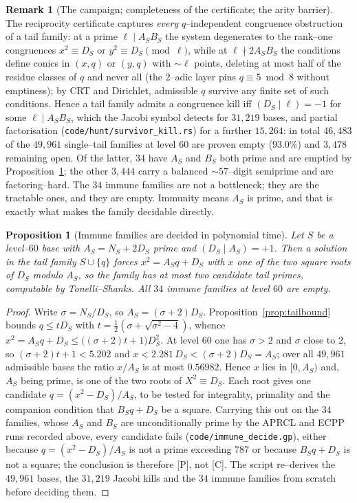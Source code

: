 \documentclass[11pt]{article}
\newtheorem{proposition}[theorem]{Proposition}
\theoremstyle{definition}
\newtheorem{remark}[theorem]{Remark}
\begin{document}
\begin{remark}[The campaign; completeness of the certificate; the arity barrier]\label{rem:campaign}
The reciprocity certificate captures \emph{every} $q$--independent congruence obstruction of a
tail family: at a prime $\ell\mid A_SB_S$ the system degenerates to the rank--one congruences
$x^2\equiv D_S$ or $y^2\equiv D_S\pmod\ell$, while at $\ell\nmid 2A_SB_S$ the conditions define
conics in $(x,q)$ or $(y,q)$ with $\sim\ell$ points, deleting at most half of the residue classes
of $q$ and never all (the $2$--adic layer pins $q\equiv5\bmod8$ without emptiness); by CRT and
Dirichlet, admissible $q$ survive any finite set of such conditions. Hence a tail family admits a
congruence kill iff $(D_S\mid\ell)=-1$ for some $\ell\mid A_SB_S$, which the Jacobi symbol
detects for $31{,}219$ bases, and partial factorisation (\texttt{code/hunt/survivor\_kill.rs}) for a
further $15{,}264$: in total $46{,}483$ of the $49{,}961$ single--tail families at level $60$ are
proven empty ($93.0\%$) and $3{,}478$ remaining open. Of the latter, $34$ have $A_S$ and $B_S$ both
prime and are emptied by Proposition~\ref{prop:immunedecide}; the other $3{,}444$ carry a balanced
${\sim}57$--digit semiprime and are factoring--hard.
The $34$ immune families are not a bottleneck; they are the tractable ones, and they are empty.
Immunity means $A_S$ is prime, and that is exactly what makes the family decidable directly.

\begin{proposition}[Immune families are decided in polynomial time]\label{prop:immunedecide}
Let $S$ be a level--$60$ base with $A_S=N_S+2D_S$ prime and $(D_S\mid A_S)=+1$. Then a solution in the
tail family $S\cup\{q\}$ forces $x^2=A_Sq+D_S$ with $x$ one of the two square roots of $D_S$ modulo
$A_S$, so the family has at most two candidate tail primes, computable by Tonelli--Shanks. All $34$
immune families at level $60$ are empty.
\end{proposition}
\begin{proof}
Write $\sigma=N_S/D_S$, so $A_S=(\sigma+2)D_S$. Proposition~\ref{prop:tailbound} bounds
$q\le tD_S$ with $t=\tfrac12(\sigma+\sqrt{\sigma^2-4})$, whence
$x^2=A_Sq+D_S\le\bigl((\sigma+2)t+1\bigr)D_S^2$. At level $60$ one has $\sigma>2$ and $\sigma$ close
to $2$, so $(\sigma+2)t+1<5.202$ and $x<2.281\,D_S<(\sigma+2)D_S=A_S$; over all $49{,}961$ admissible
bases the ratio $x/A_S$ is at most $0.56982$. Hence $x$ lies in $[0,A_S)$ and, $A_S$ being prime, is one
of the two roots of $X^2\equiv D_S$. Each root gives one candidate
$q=(x^2-D_S)/A_S$, to be tested for integrality, primality and the companion condition that
$B_Sq+D_S$ be a square. Carrying this out on the $34$ families, whose $A_S$ and $B_S$ are
unconditionally prime by the \textup{APRCL} and \textup{ECPP} runs recorded above, every candidate
fails \textup{(\texttt{code/immune\_decide.gp})}, either because
$q=(x^2-D_S)/A_S$ is not a prime exceeding $787$ or because $B_Sq+D_S$ is not a square; the conclusion
is therefore \textup{[P]}, not \textup{[C]}. The script re--derives the $49{,}961$ bases, the $31{,}219$
Jacobi kills and the $34$ immune families from scratch before deciding them.
\end{proof}


\end{remark}
\end{document}
